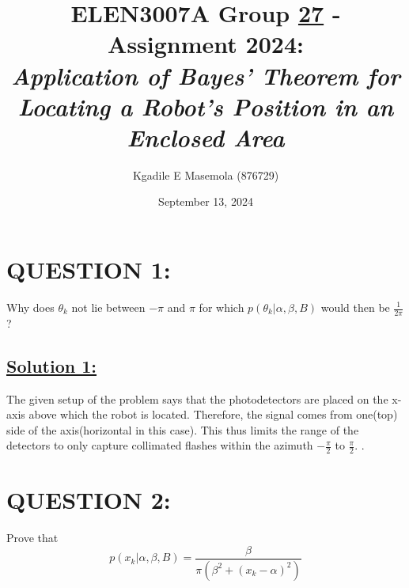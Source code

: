 \documentclass[a4paper,11pt]{article}
\title{ELEN3007A Group \underline{27} - Assignment 2024: \\ 
\large \emph{Application of Bayes’ Theorem for Locating a Robot’s
Position in an Enclosed Area}}
\author{Kgadile E Masemola (876729)}
\date{September 13, 2024}
\begin{document}
\maketitle

\section{QUESTION 1:}  Why does $\theta_k$ not lie between $- \pi$ and $\pi$ for which $p(\theta_k | \alpha, \beta, B)$ would then be $\frac{1}{2\pi}$?

\subsection*{\underline{Solution 1:}}
The given setup of the problem says that the photodetectors are placed on the x-axis above which the robot is located. Therefore, the signal comes from one(top) side of the axis(horizontal in this case). This thus limits the range of the detectors to only capture collimated flashes within the azimuth $-\frac{\pi}{2}$ to $\frac{\pi}{2}$. . 

\section{QUESTION 2:}
Prove that
\begin{equation}
	p(x_k | \alpha, \beta, B) = \frac{\beta}{\pi (\beta^2 + (x_k - \alpha)^2)}
\end{equation}
\end{document}
